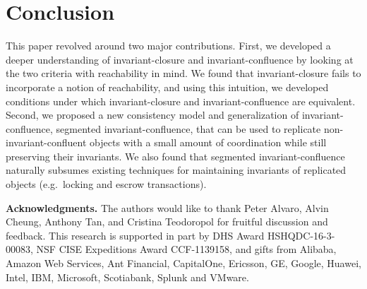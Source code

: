 \section{Conclusion}
This paper revolved around two major contributions.  First, we developed a
deeper understanding of invariant-closure and invariant-confluence by looking
at the two criteria with reachability in mind. We found that invariant-closure
fails to incorporate a notion of reachability, and using this intuition, we
developed conditions under which invariant-closure and invariant-confluence are
equivalent. Second, we proposed a new consistency model and generalization of
invariant-confluence, segmented invariant-confluence, that can be used to
replicate non-invariant-confluent objects with a small amount of coordination
while still preserving their invariants. We also found that segmented
invariant-confluence naturally subsumes existing techniques for maintaining
invariants of replicated objects (e.g.\ locking and escrow transactions).

\textbf{Acknowledgments.}
The authors would like to thank Peter Alvaro, Alvin Cheung, Anthony Tan,
and Cristina Teodoropol for fruitful discussion and feedback.
%
This research is supported in part by DHS Award HSHQDC-16-3-00083, NSF CISE
Expeditions Award CCF-1139158, and gifts from Alibaba, Amazon Web Services, Ant
Financial, CapitalOne, Ericsson, GE, Google, Huawei, Intel, IBM, Microsoft,
Scotiabank, Splunk and VMware.
